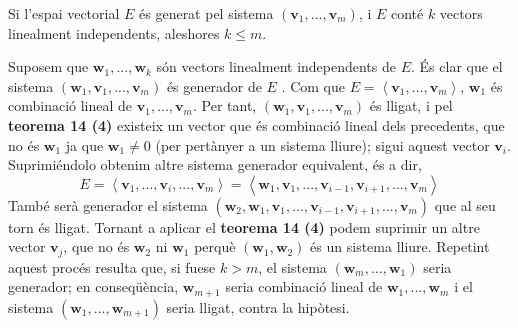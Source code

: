 \begin{teorema}
Si l’espai vectorial $E$ és generat pel sistema $(\mathbf{v%
}_{1},...,\mathbf{v}_{m})$, i $E$ conté $k$ vectors linealment
independents, aleshores $k\leq m$.

\end{teorema}
\begin{prova}
Suposem que $\mathbf{w}_{1},...,\mathbf{w}_{k}$ són vectors linealment
independents de $E$. És clar que el sistema $\left( \mathbf{w}%
_{1},\mathbf{v}_{1},...,\mathbf{v}_{m}\right) $ és generador de $E$%
. Com que $E=\left\langle \mathbf{v}_{1},...,\mathbf{v}%
_{m}\right\rangle $, $\mathbf{w}_{1}$ és combinació lineal de $\mathbf{v%
}_{1},...,\mathbf{v}_{m}$. Per tant, $\left( \mathbf{w}_{1},\mathbf{v}%
_{1},...,\mathbf{v}_{m}\right) $ és lligat, i pel \textbf{teorema 14 (4)}
existeix un vector que és combinació lineal dels precedents, que no és 
$\mathbf{w}_{1}$ ja que $\mathbf{w}_{1}\neq 0$ (per pertànyer a un sistema
lliure); sigui aquest vector $\mathbf{v}_{i}$. Suprimiéndolo obtenim altre
sistema generador equivalent, és a dir,%
\begin{equation*}
E=\left\langle \mathbf{v}_{1},...,\mathbf{v}_{i},...,\mathbf{v}%
_{m}\right\rangle =\left\langle \mathbf{w}_{1},\mathbf{v}_{1},...,\mathbf{v}%
_{i-1},\mathbf{v}_{i+1},...,\mathbf{v}_{m}\right\rangle
\end{equation*}%
També serà generador el sistema $\left( \mathbf{w}_{2},\mathbf{w}%
_{1},\mathbf{v}_{1},...,\mathbf{v}_{i-1},\mathbf{v}_{i+1},...,\mathbf{v}%
_{m}\right) $ que al seu torn és lligat. Tornant a aplicar el \textbf{teorema
14 (4)} podem suprimir un altre vector $\mathbf{v}_{j}$, que no és $\mathbf{w}%
_{2}$ ni $\mathbf{w}_{1}$ perquè $(\mathbf{w}_{1},\mathbf{w}_{2})$ és un
sistema lliure. Repetint aquest procés resulta que, si fuese $k>m$, el
sistema $\left( \mathbf{w}_{m},...,\mathbf{w}_{1}\right) $ seria
generador; en conseqüència, $\mathbf{w}_{m+1}$ seria combinació lineal de $%
\mathbf{w}_{1},...,\mathbf{w}_{m}$ i el sistema $\left( \mathbf{w}_{1},...,%
\mathbf{w}_{m+1}\right) $ seria lligat, contra la hipòtesi.
\end{prova}

